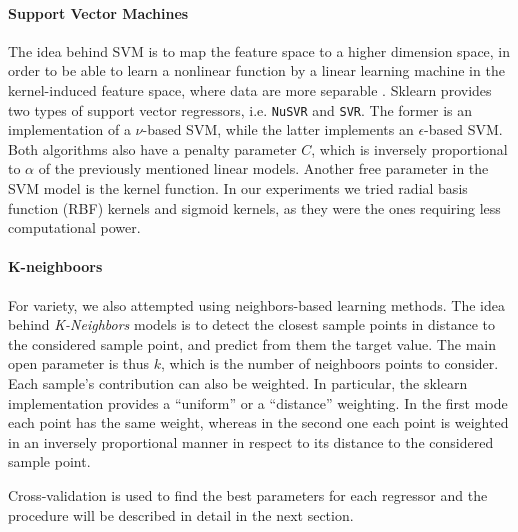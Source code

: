 \paragraph{Support Vector Machines}
The idea behind SVM is to map the feature space to a higher dimension space, in order to be able to learn a nonlinear function by a linear learning machine in the kernel-induced feature space, where data are more separable \cite{yang2008regression}.
Sklearn provides two types of support vector regressors, i.e. \texttt{NuSVR} and \texttt{SVR}. The former is an implementation of a $\nu$-based SVM, while the latter implements an $\epsilon$-based SVM. Both algorithms also have a penalty parameter $C$, which is inversely proportional to $\alpha$ of the previously mentioned linear models.
Another free parameter in the SVM model is the kernel function. In our experiments we tried radial basis function (RBF) kernels and sigmoid kernels, as they were the ones requiring less computational power.

\paragraph{K-neighboors}
For variety, we also attempted using neighbors-based learning methods.
The idea behind \emph{K-Neighbors} models is to detect the closest sample points in distance to the considered sample point, and predict from them the target value. The main open parameter is thus $k$, which is the number of neighboors points to consider.
Each sample's contribution can also be weighted. In particular, the sklearn implementation provides a ``uniform'' or a ``distance'' weighting. In the first mode each point has the same weight, whereas in the second one each point is weighted in an inversely proportional manner in respect to its distance to the considered sample point.

\vspace{1em}

Cross-validation is used to find the best parameters for each regressor and the procedure will be described in detail in the next section.
